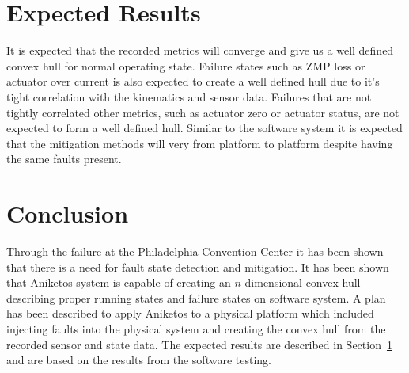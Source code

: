\section{Expected Results}
\label{sec:expResults}

It is expected that the recorded metrics will converge and give us a well defined convex hull for normal operating state.  Failure states such as ZMP loss or  actuator over current is also expected to create a well defined hull due to it's tight correlation with the kinematics and sensor data.  Failures that are not tightly correlated other metrics, such as actuator zero or actuator status, are not expected to form a well defined hull.  Similar to the software system it is expected that the mitigation methods will very from platform to platform despite having the same faults present.

\section{Conclusion}
Through the failure at the Philadelphia Convention Center it has been shown that there is a need for fault state detection and mitigation.
It has been shown that Aniketos system is capable of creating an $n$-dimensional convex hull describing proper running states and failure states on software system.  A plan has been described to apply Aniketos to a physical platform which included injecting faults into the physical system and creating the convex hull from the recorded sensor and state data.  The expected results are described in Section~\ref{sec:expResults} and are based on the results from the software testing.
